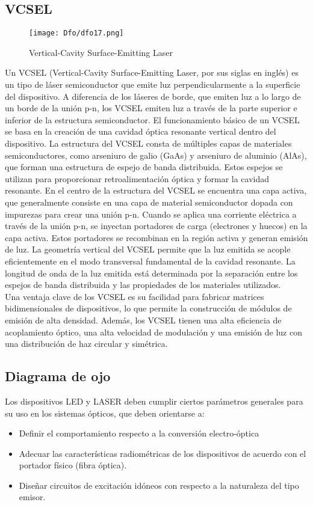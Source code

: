 \documentclass[
	12pt, %
	fleqn, %
	a4paper, %
	oneside, %
]{LegrandOrangeBook}
\begin{document}
\subsection{VCSEL}
\begin{figure}[H]
\centering
\texttt{[image: Dfo/dfo17.png]}
\caption{Vertical-Cavity Surface-Emitting Laser}
\end{figure}
Un VCSEL (Vertical-Cavity Surface-Emitting Laser, por sus siglas en inglés) es un tipo de láser semiconductor que emite luz perpendicularmente a la superficie del dispositivo. A diferencia de los láseres de borde, que emiten luz a lo largo de un borde de la unión p-n, los VCSEL emiten luz a través de la parte superior e inferior de la estructura semiconductor. El funcionamiento básico de un VCSEL se basa en la creación de una cavidad óptica resonante vertical dentro del dispositivo. La estructura del VCSEL consta de múltiples capas de materiales semiconductores, como arseniuro de galio (GaAs) y arseniuro de aluminio (AlAs), que forman una estructura de espejo de banda distribuida. Estos espejos se utilizan para proporcionar retroalimentación óptica y formar la cavidad resonante. En el centro de la estructura del VCSEL se encuentra una capa activa, que generalmente consiste en una capa de material semiconductor dopada con impurezas para crear una unión p-n. Cuando se aplica una corriente eléctrica a través de la unión p-n, se inyectan portadores de carga (electrones y huecos) en la capa activa. Estos portadores se recombinan en la región activa y generan emisión de luz. La geometría vertical del VCSEL permite que la luz emitida se acople eficientemente en el modo transversal fundamental de la cavidad resonante. La longitud de onda de la luz emitida está determinada por la separación entre los espejos de banda distribuida y las propiedades de los materiales utilizados.\\
Una ventaja clave de los VCSEL es su facilidad para fabricar matrices bidimensionales de dispositivos, lo que permite la construcción de módulos de emisión de alta densidad. Además, los VCSEL tienen una alta eficiencia de acoplamiento óptico, una alta velocidad de modulación y una emisión de luz con una distribución de haz circular y simétrica.
\subsection{Diagrama de ojo}
Los dispositivos LED y LASER deben cumplir ciertos parámetros generales para su uso en los sistemas ópticos, que deben orientarse a:
\begin{itemize}
\item Definir el comportamiento respecto a la conversión electro-óptica
\item Adecuar las características radiométricas de los dispositivos de acuerdo con el portador físico (fibra óptica).
\item Diseñar circuitos de excitación idóneos con respecto a la naturaleza del tipo emisor.
\end{itemize}
\end{document}
